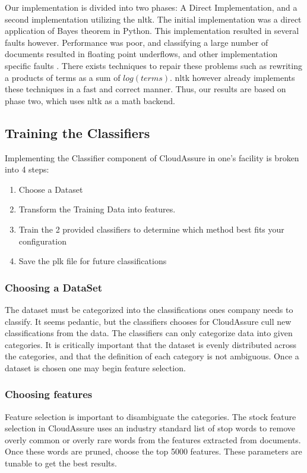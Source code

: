 Our implementation is divided into two phases: A Direct Implementation, and
a second implementation utilizing the \gls{nltk}. The initial implementation was
a direct application of Bayes theorem in Python. This implementation resulted in
several faults however. Performance was poor, and classifying a large number of
documents resulted in floating point underflows, and other implementation
specific faults \autocite{Graham-Cummings2005}. There exists techniques to repair these problems such as
rewriting a products  of terms as a sum of \(log(terms) \). \gls{nltk} however
already implements these techniques in a fast and correct manner. Thus, our results
are based on phase two, which uses \gls{nltk} as a math backend.\autocite{Denoyer2004}

\subsection{Training the Classifiers}
Implementing the Classifier component of CloudAssure in one's facility is broken
into 4 steps:
\begin{enumerate}
    \item Choose a Dataset
    \item Transform the Training Data into features.
    \item Train the 2 provided classifiers to determine which method best
        fits your configuration
    \item Save the plk file for future classifications
\end{enumerate}

\subsubsection{Choosing a DataSet}
The dataset must be categorized into the classifications ones company needs to
classify. It seems pedantic, but the classifiers chooses for CloudAssure cull
new classifications from the data. The classifiers can only categorize data into
given categories. It is critically important that the dataset is evenly distributed across the
categories, and that the definition of each category is not ambiguous. 
Once a dataset is chosen one may begin feature selection.

\subsubsection{Choosing features}
Feature selection is important to disambiguate the categories. The stock feature
selection in CloudAssure uses an industry standard list of stop words to remove
overly common or overly rare words from the features extracted from documents.
Once these words are pruned, choose the top 5000 features. These parameters are tunable
 to get the best results.

